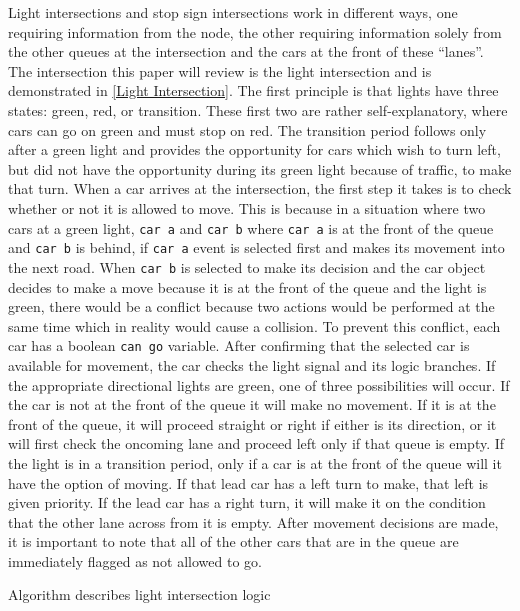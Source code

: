 Light intersections and stop sign intersections work in different ways, one requiring information from the node, the other requiring information solely from the other queues at the intersection and the cars at the front of these ``lanes''.  The intersection this paper will review is the light intersection and is demonstrated in \ref{Light Intersection}.  The first principle is that lights have three states: green, red, or transition.  These first two are rather self-explanatory, where cars can go on green and must stop on red.  The transition period follows only after a green light and provides the opportunity for cars which wish to turn left, but did not have the opportunity during its green light because of traffic, to make that turn.  When a car arrives at the intersection, the first step it takes is to check whether or not it is allowed to move.  This is because in a situation where two cars at a green light, \texttt{car a} and \texttt{car b} where \texttt{car a} is at the front of the queue and \texttt{car b} is behind, if \texttt{car a} event is selected first and makes its movement into the next road. When \texttt{car b} is selected to make its decision and the car object decides to make a move because it is at the front of the queue and the light is green, there would be a conflict because two actions would be performed at the same time which in reality would cause a collision.  To prevent this conflict, each car has a boolean \texttt{can go} variable.  After confirming that the selected car is available for movement, the car checks the light signal and its logic branches.  If the appropriate directional lights are green, one of three possibilities will occur.  If the car is not at the front of the queue it will make no movement.  If it is at the front of the queue, it will proceed straight or right if either is its direction, or it will first check the oncoming lane and proceed left only if that queue is empty.  If the light is in a transition period, only if a car is at the front of the queue will it have the option of moving. If that lead car has a left turn to make, that left is given priority. If the lead car has a right turn, it will make it on the condition that the other lane across from it is empty.  After movement decisions are made, it is important to note that all of the other cars that are in the queue are immediately flagged as not allowed to go.

\begin{algorithm}
 \SetAlgoLined
 \caption{Algorithm describes light intersection logic}
\label{Light Intersection}
\end{algorithm}

